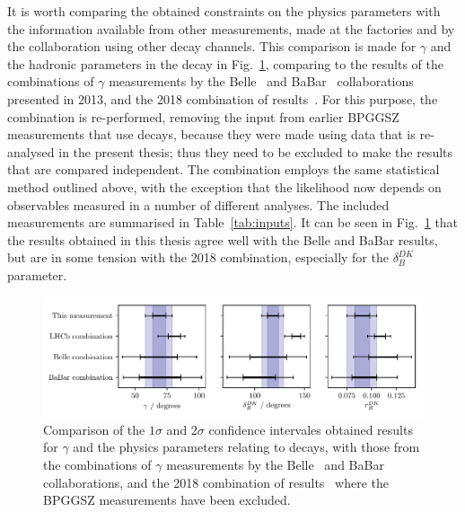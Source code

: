 It is worth comparing the obtained constraints on the physics parameters with the information available from other measurements, made at the \B factories and by the \lhcb collaboration using other decay channels. This comparison is made for $\gamma$ and the hadronic parameters in the \BtoDK decay in Fig.~\ref{fig:all_gamma_results}, comparing to the results of the combinations of $\gamma$ measurements by the Belle~\cite{BelleCombo} and BaBar~\cite{BabarCombo} collaborations presented in 2013, and the 2018 combination of \lhcb results~\cite{LHCb-CONF-2018-002}. For this purpose, the \lhcb combination is re-performed,  removing the input from earlier BPGGSZ measurements that use \BtoDK decays, because they were made using data that is re-analysed in the present thesis; thus they need to be excluded to make the results that are compared independent. The combination employs the same statistical method outlined above, with the exception that the likelihood now depends on observables measured in a number of different analyses. The included measurements are summarised in Table~\ref{tab:inputs}. It can be seen in Fig.~\ref{fig:all_gamma_results} that the results obtained in this thesis agree well with the Belle and BaBar results, but are in some tension with the 2018 \lhcb combination, especially for the $\delta_B^{DK}$ parameter.

\begin{figure}[tb]
    \centering
    \includegraphics[width=\columnwidth]{figures/analysis/interpretation/experiment_comparison.pdf}
    \caption{Comparison of the $1\sigma$ and $2\sigma$ confidence intervales obtained results for $\gamma$ and the physics parameters relating to \BtoDK decays, with those from the combinations of $\gamma$ measurements by the Belle~\cite{BelleCombo} and BaBar~\cite{BabarCombo} collaborations, and the 2018 combination of \lhcb results~\cite{LHCb-CONF-2018-002} where the BPGGSZ measurements have been excluded.}
    \label{fig:all_gamma_results}
\end{figure}

